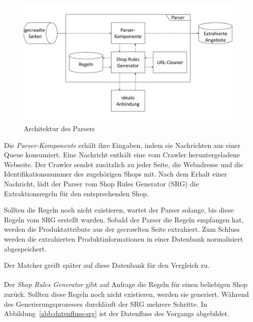 \begin{figure}[H]
    \centering
    \includegraphics[width=\textwidth, trim=0 1.7cm 0 1.7cm, clip]{resources/Architektur-Parser.pdf}
    \caption{Architektur des Parsers}
    \label{abb:architektur-parser}
    \vspace{-0.5cm}
\end{figure}

Die \textit{Parser-Komponente} erhält ihre Eingaben, indem sie Nachrichten aus einer Queue konsumiert.
Eine Nachricht enthält eine vom Crawler heruntergeladene Webseite.
Der Crawler sendet zusätzlich zu jeder Seite, die Webadresse und die Identifikationsnummer des zugehörigen Shops mit.
Nach dem Erhalt einer Nachricht, lädt der Parser vom Shop Rules Generator (SRG) die Extraktionsregeln für den
entsprechenden Shop.

Sollten die Regeln noch nicht existieren, wartet der Parser solange, bis diese Regeln vom SRG erstellt wurden.
Sobald der Parser die Regeln empfangen hat, werden die Produktattribute aus der gecrawlten Seite extrahiert.
Zum Schluss werden die extrahierten Produktinformationen in einer Datenbank normalisiert abgespeichert.

Der Matcher greift später auf diese Datenbank für den Vergleich zu.
\\
~\\
Der \textit{Shop Rules Generator} gibt auf Anfrage die Regeln für einen beliebigen Shop zurück.
Sollten diese Regeln noch nicht existieren, werden sie generiert.
Während des Generierungsprozesses durchläuft der SRG mehrere Schritte.
In Abbildung~\ref{abb:datenfluss-srg} ist der Datenfluss des Vorgangs abgebildet.

